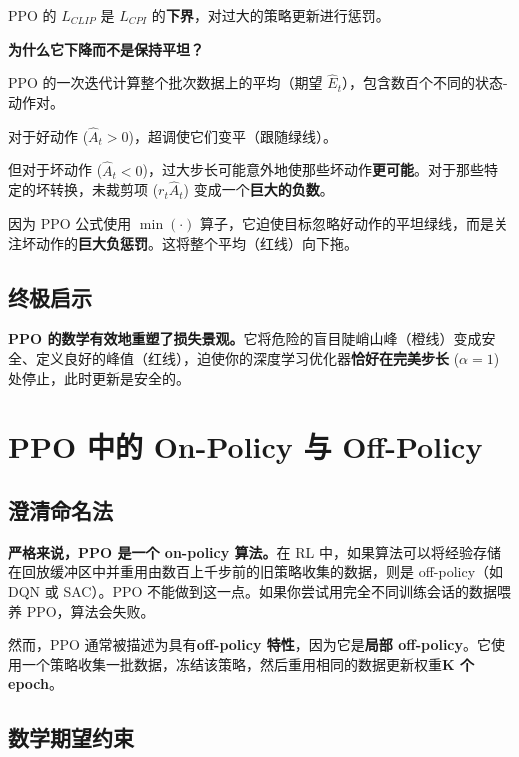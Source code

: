 \documentclass[12pt,a4paper]{article}
\theoremstyle{noteplain}
\theoremstyle{noteexercise}
\begin{document}
PPO 的 $L_{CLIP}$ 是 $L_{CPI}$ 的\textbf{下界}，对过大的策略更新进行惩罚。

\textbf{为什么它下降而不是保持平坦？}

PPO 的一次迭代计算整个批次数据上的平均（期望 $\hat{E}_t$），包含数百个不同的状态-动作对。

对于好动作 ($\hat{A}_t > 0$)，超调使它们变平（跟随绿线）。

但对于坏动作 ($\hat{A}_t < 0$)，过大步长可能意外地使那些坏动作\textbf{更可能}。对于那些特定的坏转换，未裁剪项 ($r_t \hat{A}_t$) 变成一个\textbf{巨大的负数}。

因为 PPO 公式使用 $\min(\cdot)$ 算子，它迫使目标忽略好动作的平坦绿线，而是关注坏动作的\textbf{巨大负惩罚}。这将整个平均（红线）向下拖。

\subsection{终极启示}

\textbf{PPO 的数学有效地重塑了损失景观。}它将危险的盲目陡峭山峰（橙线）变成安全、定义良好的峰值（红线），迫使你的深度学习优化器\textbf{恰好在完美步长} ($\alpha = 1$) 处停止，此时更新是安全的。

\section{PPO 中的 On-Policy 与 Off-Policy}\label{sec:onoff}

\subsection{澄清命名法}

\textbf{严格来说，PPO 是一个 on-policy 算法。}在 RL 中，如果算法可以将经验存储在回放缓冲区中并重用由数百上千步前的旧策略收集的数据，则是 off-policy（如 DQN 或 SAC）。PPO 不能做到这一点。如果你尝试用完全不同训练会话的数据喂养 PPO，算法会失败。

然而，PPO 通常被描述为具有\textbf{off-policy 特性}，因为它是\textbf{局部 off-policy}。它使用一个策略收集一批数据，冻结该策略，然后重用相同的数据更新权重\textbf{K 个 epoch}。

\subsection{数学期望约束}
\end{document}
